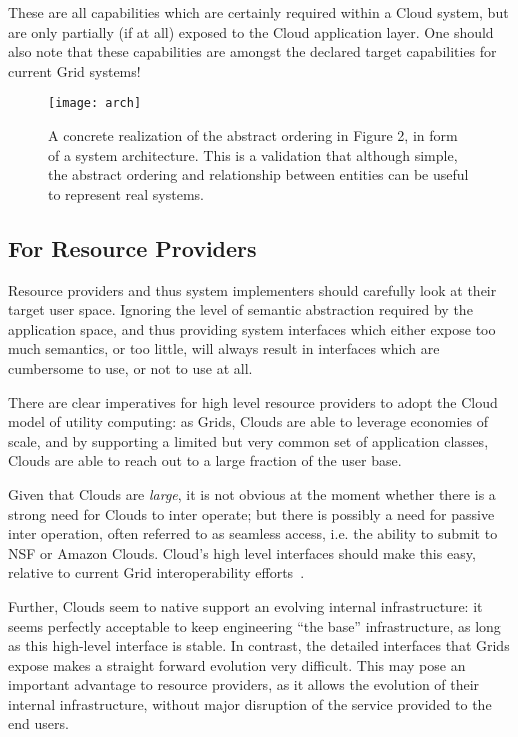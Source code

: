 \documentclass[conference,final]{IEEEtran}
\newcommand{\I}[1]{\textit{#1}}
\begin{document}
  These are all capabilities which are certainly required within a
  Cloud system, but are only partially (if at all) exposed to the
  Cloud application layer.  One should also note that these
  capabilities are amongst the declared target capabilities for
  current Grid systems\cite{physiology}!

  \begin{figure}[ht!]
   \begin{center}
    \texttt{[image: arch]}
    \caption{ A concrete realization of the abstract ordering in
      Figure 2, in form of a system architecture.  This is a validation 
      that although simple, the abstract ordering and relationship 
      between entities can be useful to represent real systems.}
    \label{fig:arch}
   \end{center}
  \end{figure}


 \subsection{For Resource Providers}

  Resource providers and thus system implementers should carefully
  look at their target user space.  Ignoring the level of semantic
  abstraction required by the application space, and thus providing
  system interfaces which either expose too much semantics, or too
  little, will always result in interfaces which are cumbersome to
  use, or not to use at all.

  There are clear imperatives for high level resource providers to
  adopt the Cloud model of utility computing: as Grids, Clouds are
  able to leverage economies of scale, and by supporting a limited but
  very common set of application classes, Clouds are able to reach out
  to a large fraction of the user base.  
  
  Given that Clouds are \I{large}, it is not obvious at the moment
  whether there is a strong need for Clouds to inter operate;  but
  there is possibly a need for passive inter operation, often referred
  to as seamless access, i.e. the ability to submit to NSF or Amazon
  Clouds.  Cloud's high level interfaces should make this easy,
  relative to current Grid interoperability efforts~\cite{gin}.    

  Further, Clouds seem to native support an evolving internal
  infrastructure: it seems perfectly acceptable to keep engineering
  ``the base'' infrastructure, as long as this high-level interface is
  stable.  In contrast, the detailed interfaces that Grids expose
  makes a straight forward evolution very difficult.  This may pose an
  important advantage to resource providers, as it allows the
  evolution of their internal infrastructure, without major disruption
  of the service provided to the end users.
\end{document}
